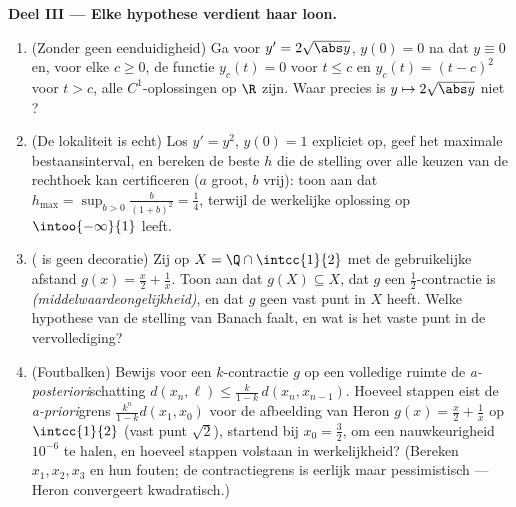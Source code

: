 \begin{problem}
\medskip
\noindent\textbf{Deel III --- Elke hypothese verdient haar loon.}
\begin{enumerate}[resume]
  \item (Zonder  geen eenduidigheid) Ga voor $y' =
        2\sqrt{\abs y}$, $y(0) = 0$ na dat $y \equiv 0$ en, voor
        elke $c \geq 0$, de functie $y_c(t) = 0$ voor $t \leq c$
        en $y_c(t) = (t - c)^2$ voor $t > c$, alle
        $C^1$-oplossingen op $\R$ zijn. Waar precies is $y \mapsto
        2\sqrt{\abs y}$ niet ?
  \item (De lokaliteit is echt) Los $y' = y^2$, $y(0) = 1$
        expliciet op, geef het maximale bestaansinterval, en
        bereken de beste $h$ die de stelling over alle keuzen van
        de rechthoek kan certificeren ($a$ groot, $b$ vrij): toon
        aan dat $h_{\max} = \sup_{b>0} \frac{b}{(1+b)^2} =
        \frac14$, terwijl de werkelijke oplossing op
        $\intoo{-\infty}{1}$ leeft.
  \item ( is geen decoratie) Zij op $X = \Q \cap
        \intcc{1}{2}$ met de gebruikelijke afstand $g(x) = \frac
        x2 + \frac1x$. Toon aan dat $g(X) \subseteq X$, dat $g$
        een $\frac12$-contractie is \emph{(middelwaarde\-ongelijkheid)},
        en dat $g$ geen vast punt in $X$
        heeft. Welke hypothese van de stelling van Banach faalt,
        en wat is het vaste punt in de vervollediging?
  \item (Foutbalken) Bewijs voor een $k$-contractie $g$ op een
        volledige ruimte de \emph{a-posteriori}schatting $d(x_n,
        \ell) \leq \frac{k}{1-k}\,d(x_n, x_{n-1})$. Hoeveel
        stappen eist de \emph{a-priori}grens $\frac{k^n}{1-k}d(x_1,
        x_0)$ voor de afbeelding van Heron $g(x) = \frac x2 +
        \frac 1x$ op $\intcc{1}{2}$ (vast punt $\sqrt2$), startend
        bij $x_0 = \frac32$, om een nauwkeurigheid $10^{-6}$ te
        halen, en hoeveel stappen volstaan in werkelijkheid?
        (Bereken $x_1, x_2, x_3$ en hun fouten; de
        contractiegrens is eerlijk maar pessimistisch --- Heron
        convergeert kwadratisch.)
\end{enumerate}


\end{problem}
